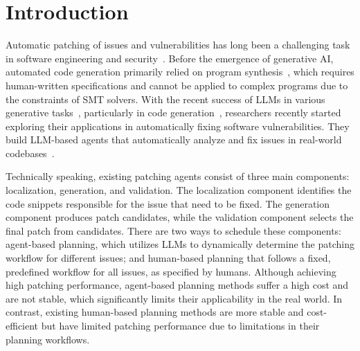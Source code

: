 \section{Introduction}
\label{sec:intro}

Automatic patching of issues and vulnerabilities has long been a challenging task in software engineering and security~\cite{jiang2021cure,le2021automatic,monperrus2018automatic,gazzola2018automatic}. 
Before the emergence of generative AI, automated code generation primarily relied on program synthesis~\cite{feng2018program,huang2019using}, which requires human-written specifications and cannot be applied to complex programs due to the constraints of SMT solvers.
With the recent success of LLMs in various generative tasks~\cite{peng2023study,lian2023llm,ghosal2023text,huang2024audiogpt}, particularly in code generation~\cite{zhu2024deepseek,claude3,achiam2023gpt,team2023gemini,roziere2023code}, researchers recently started exploring their applications in automatically fixing software vulnerabilities. 
They build LLM-based agents that automatically analyze and fix issues in real-world codebases~\cite{wang2024openhands,liu2024marscode,ruan2024specrover,zhang2024autocoderover,yang2024swe}.

Technically speaking, existing patching agents consist of three main components: localization, generation, and validation.
The localization component identifies the code snippets responsible for the issue that need to be fixed. 
The generation component produces patch candidates, while the validation component selects the final patch from candidates.
There are two ways to schedule these components:
agent-based planning\cite{yang2024swe,moatless,zhang2024autocoderover,IBM_SWE1_0,liu2024marscode,CodeR,pedregosa2011scikit,ma2024lingma,wang2024openhands,Amazon_Q}, which utilizes LLMs to dynamically determine the patching workflow for different issues;
and human-based planning\cite{xia2024agentless,ouyang2024repograph} that follows a fixed, predefined workflow for all issues, as specified by humans.
Although achieving high patching performance, agent-based planning methods suffer a high cost and are not stable, which significantly limits their applicability in the real world.   
In contrast, existing human-based planning methods are more stable and cost-efficient but have limited patching performance due to limitations in their planning workflows.

